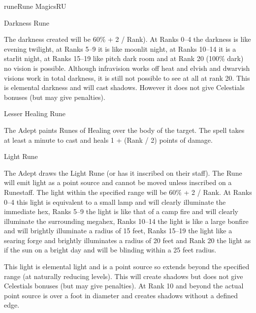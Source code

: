 \begin{College}[2.2]{rune}{Rune Magics}{RU}
\begin{spell}[G-2]{Darkness Rune}
\begin{effects}
The darkness created will be 60\% + 2 / Rank). At Ranks 0--4 the
darkness is like evening twilight, at Ranks 5--9 it is like moonlit
night, at Ranks 10--14 it is a starlit night, at Ranks 15--19 like
pitch dark room and at Rank 20 (100\% dark) no vision is possible.
Although infravision works off heat and elvish and dwarvish visions
work in total darkness, it is still not possible to see at all at rank
20. This is elemental darkness and will cast shadows.  However it does
not give Celestials bonuses (but may give penalties).
\end{effects}
\end{spell}

\begin{spell}[G-3]{Lesser Healing Rune}

\begin{effects}
The Adept paints Runes of Healing over the body of the target.  The
spell takes at least a minute to cast and heals 1 + (Rank / 2) points
of damage.
\end{effects}
\end{spell}

\begin{spell}[G-4]{Light Rune}

\begin{effects}
The Adept draws the Light Rune (or has it inscribed on their staff).
The Rune will emit light as a point source and cannot be moved unless
inscribed on a Runestaff.  The light within the specified range will
be 60\% + 2 / Rank. At Ranks 0--4 this light is equivalent to a small
lamp and will clearly illuminate the immediate hex, Ranks 5--9 the
light is like that of a camp fire and will clearly illuminate the
surrounding megahex, Ranks 10--14 the light is like a large bonfire
and will brightly illuminate a radius of 15 feet, Ranks 15--19 the
light like a searing forge and brightly illuminates a radius of 20
feet and Rank 20 the light as if the sun on a bright day and will be
blinding within a 25 feet radius.

This light is elemental light and is a point source so extends beyond
the specified range (at naturally reducing levels). This will create
shadows but does not give Celestials bonuses (but may give penalties).
At Rank 10 and beyond the actual point source is over a foot in
diameter and creates shadows without a defined edge.
\end{effects}
\end{spell}


\end{College}
